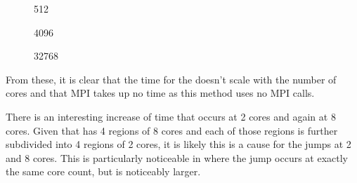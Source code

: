 %
%
\begin{figure}[!h]
    
    \caption{
        \vZeroTimeCaption
            {\replicateddata{}}
            {\individualoperation{}}
            {512}
    }
    \label{fig:v0_replicated_individual_operation_512_time}
\end  {figure}

\begin{figure}[!h]
    
    \caption{
        \vZeroTimeCaption
            {\replicateddata{}}
            {\individualoperation{}}
            {4096}
    }
    \label{fig:v0_replicated_individual_operation_4096_time}
\end  {figure}

\begin{figure}[!h]
    
    \caption{
        \vZeroTimeCaption
            {\replicateddata{}}
            {\individualoperation{}}
            {32768}
    }
    \label{fig:v0_replicated_individual_operation_32768_time}
\end  {figure}


\vZeroTimeExplanation
    {}
    {}
    {}
    {\individualoperation{}}
    {\replicateddata{}}


%
From these, it is clear that
the time for the \individualoperation{} doesn't scale with the number
of cores and that MPI takes up no time as this method uses no MPI calls.

There is an interesting increase of time that occurs at 2 cores and again
at 8 cores.
%
Given that \hector{} has 4 \numa{} regions of 8 cores and each of those
regions is further subdivided into 4 \numa{} regions of 2 cores,
it is likely this is a cause for the jumps at 2 and 8 cores.
%
This is particularly noticeable in
where the jump occurs at exactly the same core count, but is noticeably larger.

